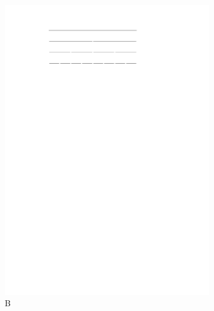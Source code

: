 \documentclass[english,gradu]{tktltiki2018}
\begin{document}
\begin{figure}
\begin{subfigure}[t]{0.3\textwidth}
		\includegraphics[width=\textwidth,page=4]{fig/iproof}
		\caption{B}\label{fig:iproof:anc}
	\end{subfigure}
	\hfil
	\begin{subfigure}[t]{0.3\textwidth}\centering

\end{subfigure}
\end{figure}
\end{document}
